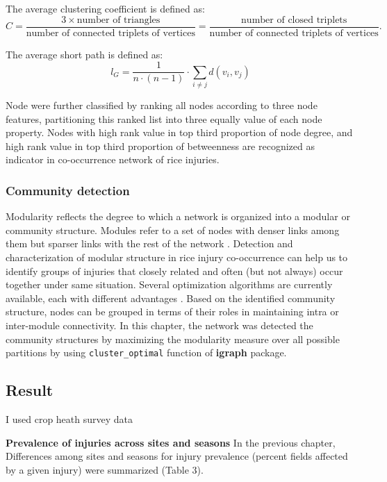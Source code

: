The average clustering coefficient is defined as:
\begin{equation}
C = \frac{3 \times \mbox{number of triangles}}{\mbox{number of connected triplets of vertices}} = \frac{\mbox{number of closed triplets}}{\mbox{number of connected triplets of vertices}}.
\end{equation}

The average short path is defined as:
\begin{equation}
l_G = \frac{1}{n \cdot (n - 1)} \cdot \sum_{i \ne j} d(v_i, v_j)
\end{equation}

Node were further classified by ranking all nodes according to three node features, partitioning this ranked list into three equally value of each node property. Nodes with high rank value in top third proportion of node degree, and high rank value in top third proportion of betweenness are recognized as indicator in co-occurrence network of rice injuries. 


\subsubsection{Community detection}

Modularity reflects the degree to which a network is organized into a modular or community structure. Modules refer to a set of nodes with denser links among them but sparser links with the rest of the network \citep{Newman_2006_Modularity}. Detection and characterization of modular structure in rice injury co-occurrence can help us to identify groups of injuries that closely related and often (but not always) occur together under same situation. Several optimization algorithms are currently available, each with different advantages \citep{Brandes_2008_Modularity}. Based on the identified community structure, nodes can be grouped in terms of their roles in maintaining intra or inter-module connectivity. In this chapter, the network was detected the community structures by maximizing the modularity measure over all possible partitions by using \texttt{cluster\_optimal} function of \textbf{igraph} package.

\subsection{Result}
I used crop heath survey data

\textbf{Prevalence of injuries across sites and seasons}
In the previous chapter, 
Differences among sites and seasons for injury prevalence (percent fields affected by a given injury) were summarized (Table 3).

